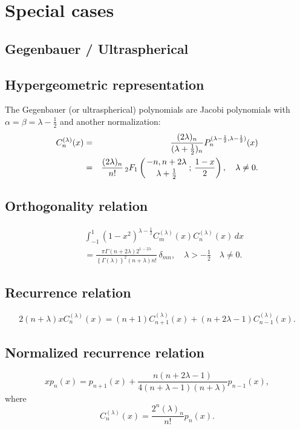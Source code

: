 \documentclass[envcountchap,graybox]{svmono}
\newcommand{\hyp}[5]{\mbox{}_{#1}{F}_{#2}
\left(\genfrac{}{}{0pt}{}{#3}{#4}\,;\,#5\right)}
\renewcommand{\Gamma}{\varGamma}
\newcommand{\hyp}[5]{\,\mbox{}_{#1}F_{#2}\!\left(
  \genfrac{}{}{0pt}{}{#3}{#4};#5\right)}
\begin{document}
\section*{Special cases}

\subsection{Gegenbauer / Ultraspherical}

\par

\subsection*{Hypergeometric representation}
The Gegenbauer (or ultraspherical) polynomials are Jacobi polynomials with
$\alpha=\beta=\lambda-\frac{1}{2}$ and another normalization:
\begin{eqnarray}
\label{DefGegenbauer}
C_n^{(\lambda)}(x)&=&\frac{(2\lambda)_n}{(\lambda+\frac{1}{2})_n}
P_n^{(\lambda-\frac{1}{2},\lambda-\frac{1}{2})}(x)\nonumber\\
&=&\frac{(2\lambda)_n}{n!}\,\hyp{2}{1}{-n,n+2\lambda}
{\lambda+\frac{1}{2}}{\frac{1-x}{2}},\quad\lambda\neq 0.
\end{eqnarray}

\subsection*{Orthogonality relation}
\begin{eqnarray}
\label{OrtGegenbauer}
& &\int_{-1}^1(1-x^2)^{\lambda-\frac{1}{2}}C_m^{(\lambda)}(x)C_n^{(\lambda)}(x)\,dx\nonumber\\
& &{}=\frac{\pi\Gamma(n+2\lambda)2^{1-2\lambda}}{\left\{\Gamma(\lambda)\right\}^2(n+\lambda)n!}\,\delta_{mn},
\quad\lambda>-\frac{1}{2}\quad\lambda\neq 0.
\end{eqnarray}

\subsection*{Recurrence relation}
\begin{equation}
\label{RecGegenbauer}
2(n+\lambda)xC_n^{(\lambda)}(x)=(n+1)C_{n+1}^{(\lambda)}(x)+(n+2\lambda-1)C_{n-1}^{(\lambda)}(x).
\end{equation}

\subsection*{Normalized recurrence relation}
\begin{equation}
\label{NormRecGegenbauer}
xp_n(x)=p_{n+1}(x)+\frac{n(n+2\lambda-1)}{4(n+\lambda-1)(n+\lambda)}p_{n-1}(x),
\end{equation}
where
$$C_n^{(\lambda)}(x)=\frac{2^n(\lambda)_n}{n!}p_n(x).$$
\end{document}
